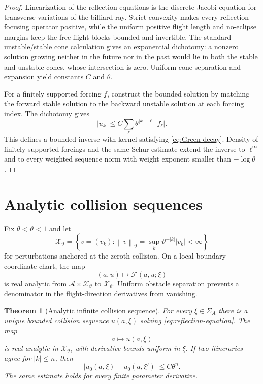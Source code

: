 \documentclass[11pt,reqno]{amsart}
\newtheorem{theorem}{Theorem}[section]
\theoremstyle{definition}
\theoremstyle{remark}
\newcommand{\X}{\mathcal X}
\newcommand{\F}{\mathcal F}
\newcommand{\norm}[1]{\left\lVert#1\right\rVert}
\newcommand{\abs}[1]{\left\lvert#1\right\rvert}
\begin{document}
\begin{proof}
Linearization of the reflection equations is the discrete Jacobi equation for
transverse variations of the billiard ray.  Strict convexity makes every
reflection focusing operator positive, while the uniform positive flight
length and no-eclipse margins keep the free-flight blocks bounded and
invertible.  The standard unstable/stable cone calculation gives an exponential
dichotomy: a nonzero solution growing neither in the future nor in the past
would lie in both the stable and unstable cones, whose intersection is zero.
Uniform cone separation and expansion yield constants $C$ and $\theta$.

For a finitely supported forcing $f$, construct the bounded solution by
matching the forward stable solution to the backward unstable solution at each
forcing index.  The dichotomy gives
\[
 \abs{u_k}\le C\sum_\ell\theta^{\abs{k-\ell}}\abs{f_\ell}.
\]
This defines a bounded inverse with kernel satisfying
\eqref{eq:Green-decay}.  Density of finitely supported forcings and the same
Schur estimate extend the inverse to $\ell^\infty$ and to every weighted
sequence norm with weight exponent smaller than $-\log\theta$.
\end{proof}

\section{Analytic collision sequences}

Fix $\theta<\vartheta<1$ and let
\[
 \X_\vartheta=\left\{v=(v_k):
 \norm v_\vartheta=\sup_k\vartheta^{-\abs k}\abs{v_k}<\infty\right\}
\]
for perturbations anchored at the zeroth collision.  On a local boundary
coordinate chart, the map
\[
 (a,u)\longmapsto\F(a,u;\xi)
\]
is real analytic from $\mathcal A\times\X_\vartheta$ to
$\X_\vartheta$.  Uniform obstacle separation prevents a denominator in the
flight-direction derivatives from vanishing.

\begin{theorem}[Analytic infinite collision sequence]\label{thm:analytic-sequence}
For every $\xi\in\Sigma_A$ there is a unique bounded collision sequence
$u(a,\xi)$ solving \eqref{eq:reflection-equation}.  The map
\[
 a\longmapsto u(a,\xi)
\]
is real analytic in $\X_\vartheta$, with derivative bounds uniform in
$\xi$.  If two itineraries agree for $\abs k\le n$, then
\begin{equation}\label{eq:holder-coding}
 \abs{u_0(a,\xi)-u_0(a,\xi')}
 \le C\theta^n.
\end{equation}
The same estimate holds for every finite parameter derivative.
\end{theorem}
\end{document}
